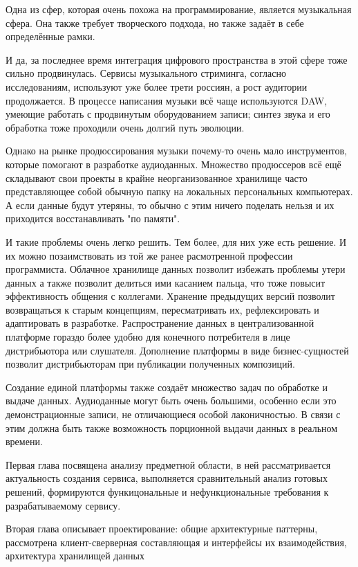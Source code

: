 \documentclass[14pt]{extarticle}
\begin{document}
Одна из сфер, которая очень похожа на программирование, является музыкальная сфера. 
Она также требует творческого подхода, но также задаёт в себе определённые рамки.

И да, за последнее время интеграция цифрового пространства в этой сфере тоже сильно продвинулась. 
Сервисы музыкального стриминга, согласно исследованиям, используют уже более трети 
россиян, а рост аудитории продолжается. В процессе написания музыки всё чаще используются 
DAW, умеющие работать с продвинутым оборудованием записи; синтез звука и его обработка тоже проходили 
очень долгий путь эволюции. 

Однако на рынке продюссирования музыки почему-то очень мало инструментов, которые помогают 
в разработке аудиоданных. Множество продюссеров всё ещё складывают свои проекты в крайне неорганизованное
хранилище часто представляющее собой обычную папку на локальных персональных компьютерах. А 
если данные будут утеряны, то обычно с этим ничего поделать нельзя и их приходится восстанавливать
"по памяти".

И такие проблемы очень легко решить. Тем более, для них уже есть решение. И их можно 
позаимствовать из той же ранее расмотренной профессии программиста. Облачное хранилище данных
позволит избежать проблемы утери данных а также позволит делиться ими касанием пальца, что 
тоже повысит эффективность общения с коллегами. Хранение предыдущих версий позволит 
возвращаться к старым концепциям, пересматривать их, рефлексировать и адаптировать в разработке.
Распространение данных в централизованной платформе гораздо более удобно для конечного потребителя
в лице дистрибьютора или слушателя. Дополнение платформы в виде бизнес-сущностей позволит 
дистрибьюторам при публикации полученных композиций.

Создание единой платформы также создаёт множество задач по обработке и выдаче данных. 
Аудиоданные могут быть очень большими, особенно если это демонстрационные записи, не отличающиеся
особой лаконичностью. В связи с этим должна быть также возможность порционной выдачи данных в реальном 
времени.

Первая глава посвящена анализу предметной области, в ней рассматривается актуальность создания 
сервиса, выполняется сравнительный анализ готовых решений, формируются функицональные и нефункциональные
требования к разрабатываемому сервису.

Вторая глава описывает проектирование: общие архитектурные паттерны, рассмотрена клиент-сверверная
составляющая и интерфейсы их взаимодействия, архитектура хранилищей данных
\end{document}
